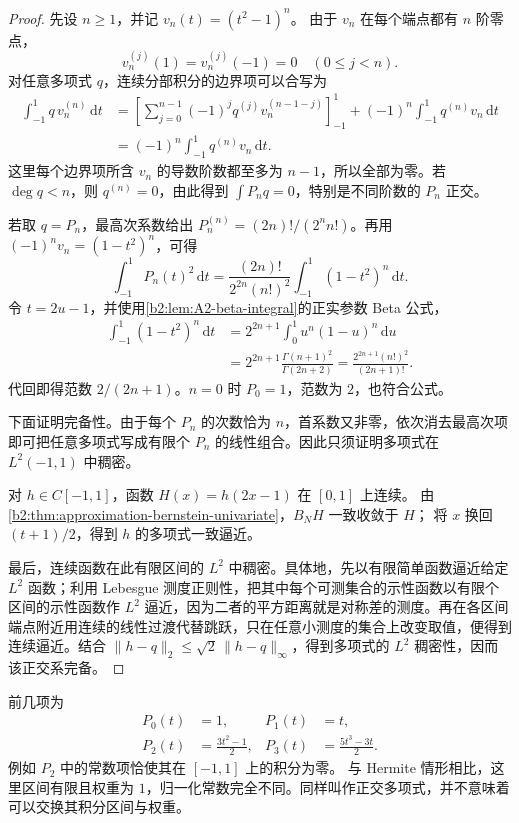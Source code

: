 \begin{proof}
先设 \(n\ge1\)，并记 \(v_n(t)=(t^2-1)^n\)。
由于 \(v_n\) 在每个端点都有 \(n\) 阶零点，
\[
 v_n^{(j)}(1)=v_n^{(j)}(-1)=0
 \quad(0\le j<n).
\]
对任意多项式 \(q\)，连续分部积分的边界项可以合写为
\[
\begin{aligned}
 \int_{-1}^1 q\,v_n^{(n)}\,\mathrm dt
 &=
 \left[\sum_{j=0}^{n-1}(-1)^j
      q^{(j)}v_n^{(n-1-j)}\right]_{-1}^1
 +(-1)^n\int_{-1}^1q^{(n)}v_n\,\mathrm dt\\
 &=(-1)^n\int_{-1}^1q^{(n)}v_n\,\mathrm dt.
\end{aligned}
\]
这里每个边界项所含 \(v_n\) 的导数阶数都至多为 \(n-1\)，所以全部为零。若 \(\deg q<n\)，则 \(q^{(n)}=0\)，由此得到
\(\int P_nq=0\)，特别是不同阶数的 \(P_n\) 正交。

若取 \(q=P_n\)，最高次系数给出
\(P_n^{(n)}=(2n)!/(2^nn!)\)。再用
\((-1)^nv_n=(1-t^2)^n\)，可得
\[
 \int_{-1}^1P_n(t)^2\,\mathrm dt
 =\frac{(2n)!}{2^{2n}(n!)^2}
      \int_{-1}^1(1-t^2)^n\,\mathrm dt.
\]
令 \(t=2u-1\)，并使用\cref{b2:lem:A2-beta-integral}的正实参数 Beta 公式，
\[
\begin{aligned}
 \int_{-1}^1(1-t^2)^n\,\mathrm dt
 &=2^{2n+1}\int_0^1u^n(1-u)^n\,\mathrm du\\
 &=2^{2n+1}\frac{\Gamma(n+1)^2}{\Gamma(2n+2)}
 =\frac{2^{2n+1}(n!)^2}{(2n+1)!}.
\end{aligned}
\]
代回即得范数 \(2/(2n+1)\)。\(n=0\) 时 \(P_0=1\)，范数为
\(2\)，也符合公式。

下面证明完备性。由于每个 \(P_n\) 的次数恰为 \(n\)，首系数又非零，依次消去最高次项即可把任意多项式写成有限个
\(P_n\) 的线性组合。因此只须证明多项式在 \(L^2(-1,1)\) 中稠密。

对 \(h\in C[-1,1]\)，函数 \(H(x)=h(2x-1)\) 在 \([0,1]\) 上连续。
由\cref{b2:thm:approximation-bernstein-univariate}，\(B_NH\) 一致收敛于 \(H\)；
将 \(x\) 换回 \((t+1)/2\)，得到 \(h\) 的多项式一致逼近。

最后，连续函数在此有限区间的 \(L^2\) 中稠密。具体地，先以有限简单函数逼近给定 \(L^2\) 函数；利用 Lebesgue 测度正则性，把其中每个可测集合的示性函数以有限个区间的示性函数作
\(L^2\) 逼近，因为二者的平方距离就是对称差的测度。再在各区间端点附近用连续的线性过渡代替跳跃，只在任意小测度的集合上改变取值，便得到连续逼近。结合
\(\|h-q\|_2\le\sqrt2\,\|h-q\|_\infty\)，得到多项式的
\(L^2\) 稠密性，因而该正交系完备。
\end{proof}

前几项为
\[
\begin{aligned}
 P_0(t)&=1,& P_1(t)&=t,\\
 P_2(t)&=\frac{3t^2-1}{2},&
 P_3(t)&=\frac{5t^3-3t}{2}.
\end{aligned}
\]
例如 \(P_2\) 中的常数项恰使其在 \([-1,1]\) 上的积分为零。
与 Hermite 情形相比，这里区间有限且权重为 \(1\)，归一化常数完全不同。同样叫作正交多项式，并不意味着可以交换其积分区间与权重。


